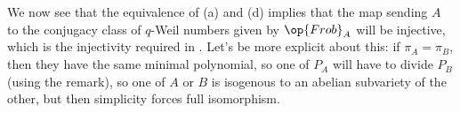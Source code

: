 \documentclass[../notes.tex]{subfiles}
\begin{document}
We now see that the equivalence of (a) and (d) implies that the map sending $A$ to the conjugacy class of $q$-Weil numbers given by $\op{Frob}_A$ will be injective, which is the injectivity required in . Let's be more explicit about this: if $\pi_A=\pi_B$, then they have the same minimal polynomial, so one of $P_A$ will have to divide $P_B$ (using the remark), so one of $A$ or $B$ is isogenous to an abelian subvariety of the other, but then simplicity forces full isomorphism.
\end{document}
